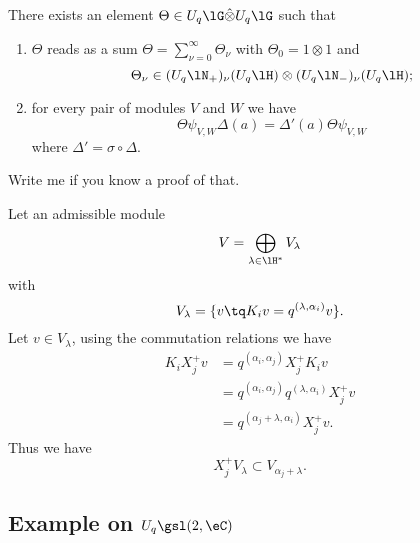 \begin{theorem}
    There exists an element \( \Theta\in U_q\lG\hat\otimes U_q\lG\) such that
    \begin{enumerate}
        \item
            \( \Theta  \) reads as a sum \( \Theta=\sum_{\nu=0}^{\infty}\Theta_{\nu}\) with \( \Theta_0=1\otimes 1\) and
            \begin{equation}
                \Theta_{\nu}\in (U_q\lN_+)_{\nu}(U_q\lH)\otimes(U_q\lN_-)_{\nu}(U_q\lH);
            \end{equation}
        \item
            for every pair of modules \( V\) and \( W\) we have
            \begin{equation}
                \Theta\psi_{V,W}\Delta(a)=\Delta'(a)\Theta\psi_{V,W}
            \end{equation}
            where \( \Delta'=\sigma\circ\Delta\).
    \end{enumerate}
\end{theorem}

\begin{probleme}
    Write me if you know a proof of that.
\end{probleme}

Let an admissible module
\begin{equation}
    V=\bigoplus_{\lambda\in\lH^*}V_{\lambda}
\end{equation}
with
\begin{equation}
    V_{\lambda}=\{ v\tq K_iv=q^{(\lambda,\alpha_i)}v \}.
\end{equation}
Let \( v\in V_{\lambda}\), using the commutation relations we have
\begin{subequations}
    \begin{align}
        K_i X_j^+v&=q^{(\alpha_i,\alpha_j)}X_j^+K_iv\\
        &=q^{(\alpha_i,\alpha_j)}q^{(\lambda,\alpha_i)}X_j^+v\\
        &=q^{(\alpha_j+\lambda,\alpha_i)}X_j^+v.
    \end{align}
\end{subequations}
Thus we have 
\begin{equation}
    X_j^+ V_{\lambda}\subset V_{\alpha_j+\lambda}.
\end{equation}

\subsection{Example on $U_q\gsl(2,\eC)$}


